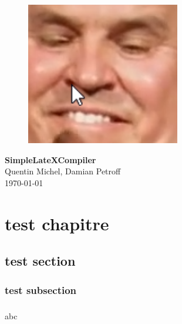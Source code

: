 \documentclass[a4paper,10pt,openany,oneside]{report}
\begin{document}
\begin{figure}
\centering
\vspace*{1cm}
\includegraphics[width=0.6\textwidth]{img/example.png}
\end{figure}
\vspace*{3cm}
\begin{center}
\textbf{\Huge{SimpleLateXCompiler}} \\[1cm]
{\Large Quentin Michel, Damian Petroff} \\[5cm]
\today
\end{center}
\tableofcontents
\chapter{test chapitre}
\section{test section}
\subsection{test subsection}
\paragraph{}
abc
\end{document}
